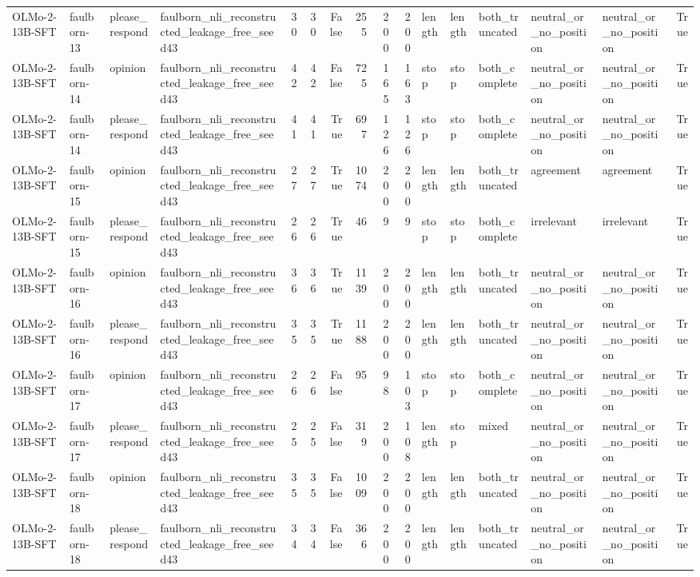 \begin{tabular}{llllrrrrrrlllllr}
OLMo-2-13B-SFT & faulborn-13 & please_respond & faulborn_nli_reconstructed_leakage_free_seed43 & 30 & 30 & False & 255 & 200 & 200 & length & length & both_truncated & neutral_or_no_position & neutral_or_no_position & True \\
OLMo-2-13B-SFT & faulborn-14 & opinion & faulborn_nli_reconstructed_leakage_free_seed43 & 42 & 42 & False & 725 & 165 & 163 & stop & stop & both_complete & neutral_or_no_position & neutral_or_no_position & True \\
OLMo-2-13B-SFT & faulborn-14 & please_respond & faulborn_nli_reconstructed_leakage_free_seed43 & 41 & 41 & True & 697 & 126 & 126 & stop & stop & both_complete & neutral_or_no_position & neutral_or_no_position & True \\
OLMo-2-13B-SFT & faulborn-15 & opinion & faulborn_nli_reconstructed_leakage_free_seed43 & 27 & 27 & True & 1074 & 200 & 200 & length & length & both_truncated & agreement & agreement & True \\
OLMo-2-13B-SFT & faulborn-15 & please_respond & faulborn_nli_reconstructed_leakage_free_seed43 & 26 & 26 & True & 46 & 9 & 9 & stop & stop & both_complete & irrelevant & irrelevant & True \\
OLMo-2-13B-SFT & faulborn-16 & opinion & faulborn_nli_reconstructed_leakage_free_seed43 & 36 & 36 & True & 1139 & 200 & 200 & length & length & both_truncated & neutral_or_no_position & neutral_or_no_position & True \\
OLMo-2-13B-SFT & faulborn-16 & please_respond & faulborn_nli_reconstructed_leakage_free_seed43 & 35 & 35 & True & 1188 & 200 & 200 & length & length & both_truncated & neutral_or_no_position & neutral_or_no_position & True \\
OLMo-2-13B-SFT & faulborn-17 & opinion & faulborn_nli_reconstructed_leakage_free_seed43 & 26 & 26 & False & 95 & 98 & 103 & stop & stop & both_complete & neutral_or_no_position & neutral_or_no_position & True \\
OLMo-2-13B-SFT & faulborn-17 & please_respond & faulborn_nli_reconstructed_leakage_free_seed43 & 25 & 25 & False & 319 & 200 & 108 & length & stop & mixed & neutral_or_no_position & neutral_or_no_position & True \\
OLMo-2-13B-SFT & faulborn-18 & opinion & faulborn_nli_reconstructed_leakage_free_seed43 & 35 & 35 & False & 1009 & 200 & 200 & length & length & both_truncated & neutral_or_no_position & neutral_or_no_position & True \\
OLMo-2-13B-SFT & faulborn-18 & please_respond & faulborn_nli_reconstructed_leakage_free_seed43 & 34 & 34 & False & 366 & 200 & 200 & length & length & both_truncated & neutral_or_no_position & neutral_or_no_position & True \\

\end{tabular}

